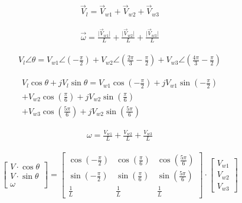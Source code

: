 \begin{equation}
    \begin{split}
        \overrightarrow{V}_{l} = 
        \overrightarrow{V}_{w1}
        + \overrightarrow{V}_{w2}
        + \overrightarrow{V}_{w3}
    \end{split}
\end{equation}

\begin{equation}
    \begin{split}
        \overrightarrow{\omega} = 
        \frac{\vert\overrightarrow{V}_{w1}\vert}{L}
        + \frac{\vert\overrightarrow{V}_{w2}\vert}{L}
        + \frac{\vert\overrightarrow{V}_{w3}\vert}{L}
    \end{split}
\end{equation}


\begin{gather*}
        V_{l} \angle \theta =  
        V_{w1} \angle \left(-\frac{\pi}{2}\right) 
        + V_{w2} \angle \left(\frac{2\pi}{3}-\frac{\pi}{2}\right) 
        + V_{w3} \angle \left(\frac{4\pi}{3}-\frac{\pi}{2}\right) 
\end{gather*}

\begin{align*}
    V_{l} \cos{ \theta } + jV_{l} \sin{\theta} =  
    V_{w1} \cos{ \left(-\frac{\pi}{2}\right)} + jV_{w1} \sin{ \left(-\frac{\pi}{2}\right) } \\
    + V_{w2}  \cos{ \left(\frac{\pi}{6}\right) } + jV_{w2}  \sin{ \left(\frac{\pi}{6}\right) }  \\
    + V_{w3} \cos{ \left(\frac{5\pi}{6}\right) } + jV_{w2}  \sin{ \left(\frac{5\pi}{6}\right) } 
\end{align*}

\begin{equation*}
    \begin{split}
        \omega = 
        \frac{V_{w1}}{L}
        + \frac{V_{w2}}{L}
        + \frac{V_{w3}}{L}
    \end{split}
\end{equation*}


\begin{gather}
	\begin{bmatrix} V\cdot \cos{\theta} \\  V\cdot \sin{\theta} \\  \omega \end{bmatrix}
	=
	\begin{bmatrix}
		\cos{\left(-\frac{\pi}{2}\right)} & \cos{\left(\frac{\pi}{6}\right)} & \cos{\left(\frac{5\pi}{6}\right)} \\
		\sin{\left(-\frac{\pi}{2}\right)} & \sin{\left(\frac{\pi}{6}\right)} & \sin{\left(\frac{5\pi}{6}\right)} \\
		\frac{1}{L} & \frac{1}{L} & \frac{1}{L}
	\end{bmatrix}
	\cdot
	\begin{bmatrix} V_{w1} \\  V_{w2} \\  V_{w3} \end{bmatrix}
\end{gather}


